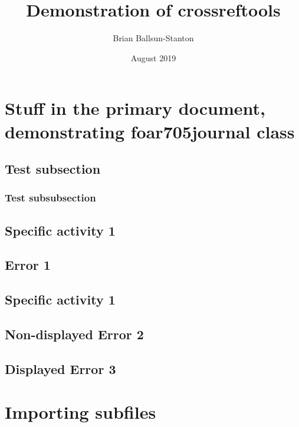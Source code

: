 \documentclass{article}
\title{Demonstration of crossreftools}
\author{Brian Ballsun-Stanton}
\date{August 2019}
\begin{document}
\maketitle

\tablesofcontentsanderrors

\section{Stuff in the primary document, demonstrating foar705journal class}



\lipsum[1]
\subsection{Test subsection}
\lipsum[1]
\subsubsection{Test subsubsection}
\lipsum[1]
\subsection{Specific activity 1}
\lipsum[1]

\solution{%
\lipsum[1]
}{%
\lipsum[1]
}{%
\lipsum[1]
}

\subsection{Error 1}
\label{Error: This was a silly error}
\lipsum[1]
\subsection{Specific activity 1}
\lipsum[1]
\subsection{Non-displayed Error 2}
\label{This was a different silly error that isn't displayed}
\lipsum[1]
\subsection{Displayed Error 3}
\label{Error: This was a different silly error that is displayed}
\lipsum[1-3]

\section{Importing subfiles}



\end{document}
